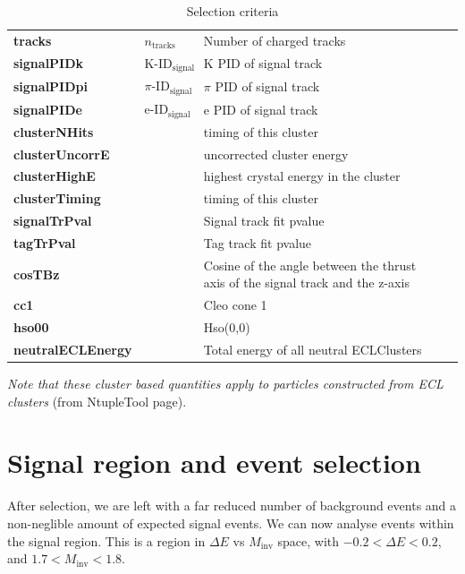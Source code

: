 \documentclass[12pt]{thesis}  %
\begin{document}
\begin{table}[h]
\begin{tabular}{lllll}
\textbf{tracks} & $n_{\text{tracks}}$ & Number of charged tracks &  &  \\
\textbf{signalPIDk} & $\text{K-ID}_{\text{signal}}$ & K PID of signal track &  &  \\
\textbf{signalPIDpi} & $\pi\text{-ID}_{\text{signal}}$ & $\pi$ PID of signal track &  &  \\
\textbf{signalPIDe} & $\text{e-ID}_{\text{signal}}$ & e PID of signal track &  &  \\
\textbf{clusterNHits} &  & timing of this cluster &  &  \\
\textbf{clusterUncorrE} &  & uncorrected cluster energy &  &  \\
\textbf{clusterHighE} &  & highest crystal energy in the cluster &  &  \\
\textbf{clusterTiming} &  & timing of this cluster &  &  \\
\textbf{signalTrPval} &  & Signal track fit pvalue &  &  \\
\textbf{tagTrPval} &  & Tag track fit pvalue &  &  \\
\textbf{cosTBz} &  & Cosine of the angle between the thrust axis of the signal track and the z-axis &  &  \\
\textbf{cc1} &  & Cleo cone 1 &  &  \\
\textbf{hso00} &  & Hso(0,0) &  &  \\
\textbf{neutralECLEnergy} &  & Total energy of all neutral ECLClusters &  & 
\end{tabular}
\caption{Selection criteria}
\label{my-label}
\end{table}


\pagebreak

\emph{Note that these cluster based quantities apply to particles constructed from ECL clusters} (from NtupleTool page).


\pagebreak


\chapter{Signal region and event selection}

After selection, we are left with a far reduced number of background events and a non-neglible amount of expected signal events. We can now analyse events within the signal region. This is a region in $\Delta E$ vs $M_{\text{inv}}$ space, with $-0.2 < \Delta E < 0.2$, and $1.7 < M_{\text{inv}} < 1.8$.
\end{document}
